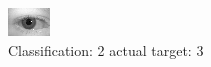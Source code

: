 \begin{figure}[h!]
\begin{center}
\includegraphics[width=0.60\columnwidth]{figures/ID556_class_2_target_3.png}
\end{center}
\caption{ Classification: 2 actual target: 3}
\label{fig:ID556_class_2_target_3}
\end{figure}
